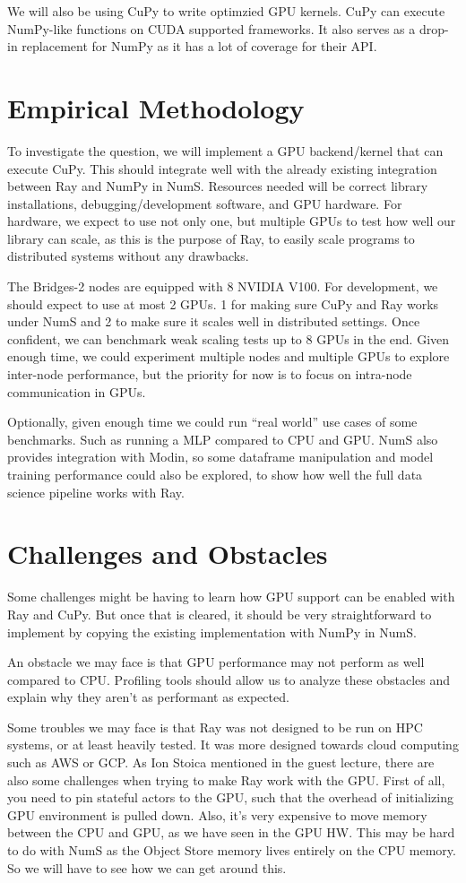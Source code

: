 \documentclass{article}
\begin{document}
We will also be using CuPy to write optimzied GPU kernels. CuPy can execute NumPy-like functions on CUDA supported frameworks. It also serves as a drop-in replacement for NumPy as it has a lot of coverage for their API. \cite{cupy_learningsys2017}

\section{Empirical Methodology}
To investigate the question, we will implement a GPU backend/kernel that can execute CuPy. This should integrate well with the already existing integration between Ray and NumPy in NumS. Resources needed will be correct library installations, debugging/development software, and GPU hardware. For hardware, we expect to use not only one, but multiple GPUs to test how well our library can scale, as this is the purpose of Ray, to easily scale programs to distributed systems without any drawbacks. 

The Bridges-2 nodes are equipped with 8 NVIDIA V100. For development, we should expect to use at most 2 GPUs. 1 for making sure CuPy and Ray works under NumS and 2 to make sure it scales well in distributed settings. Once confident, we can benchmark weak scaling tests up to 8 GPUs in the end. Given enough time, we could experiment multiple nodes and multiple GPUs to explore inter-node performance, but the priority for now is to focus on intra-node communication in GPUs.

Optionally, given enough time we could run “real world” use cases of some benchmarks. Such as running a MLP compared to CPU and GPU. NumS also provides integration with Modin, so some dataframe manipulation and model training performance could also be explored, to show how well the full data science pipeline works with Ray.

\section{Challenges and Obstacles}
Some challenges might be having to learn how GPU support can be enabled with Ray and CuPy. But once that is cleared, it should be very straightforward to implement by copying the existing implementation with NumPy in NumS. 

An obstacle we may face is that GPU performance may not perform as well compared to CPU. Profiling tools should allow us to analyze these obstacles and explain why they aren’t as performant as expected.

Some troubles we may face is that Ray was not designed to be run on HPC systems, or at least heavily tested. It was more designed towards cloud computing such as AWS or GCP. As Ion Stoica mentioned in the guest lecture, there are also some challenges when trying to make Ray work with the GPU. First of all, you need to pin stateful actors to the GPU, such that the overhead of initializing GPU environment is pulled down. \cite{Ray} Also, it's very expensive to move memory between the CPU and GPU, as we have seen in the GPU HW. This may be hard to do with NumS as the Object Store memory lives entirely on the CPU memory. So we will have to see how we can get around this. 


 
\end{document}
